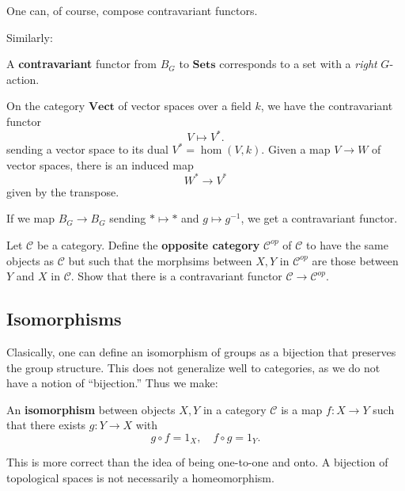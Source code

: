 One can, of course, compose contravariant functors.

Similarly:

\begin{example}
A \textbf{contravariant} functor from $B_G$ to $\mathbf{Sets}$ corresponds to a
set with a \emph{right} $G$-action.
\end{example}

\begin{example}
On the category $\mathbf{Vect}$ of vector spaces over a field $k$, we
have
the contravariant functor
\[ V \mapsto V^{\ast}.  \]
sending a vector space to its dual $V^{\ast} = \hom(V,k)$.
Given a map $V \to W$ of vector spaces, there is an induced map
\[ W^{\ast} \to V^{\ast}  \]
given by the transpose.
\end{example}

\begin{example}
If we map $B_G \to B_G$ sending $\ast \mapsto \ast$ and $g \mapsto g^{-1}$, we
get a
contravariant functor.
\end{example}

\begin{exercise}
Let $\mathcal{C}$ be a category. Define the \textbf{opposite category}
$\mathcal{C}^{op}$ of $\mathcal{C}$ to have the same objects as
$\mathcal{C}$  but such that the morphsims between $X,Y$ in
$\mathcal{C}^{op}$
are those between $Y$ and $X$ in $\mathcal{C}$.
Show that there is a contravariant functor $\mathcal{C} \to
\mathcal{C}^{op}$.
\end{exercise}

\subsection{Isomorphisms}

Clasically, one can define an isomorphism of groups as a bijection that
preserves the group structure. This does not generalize well to categories, as
we do not have a notion of ``bijection.'' Thus we make:

\begin{definition}
An \textbf{isomorphism} between objects $X, Y$ in a category $\mathcal{C}$ is a
map $f: X \to Y$ such that there exists $g: Y \to X$ with
\[ g \circ f = 1_X, \quad f \circ g = 1_Y.  \]
\end{definition}

This is more correct than the idea of being one-to-one and onto. A bijection of
topological spaces is not necessarily a homeomorphism.



